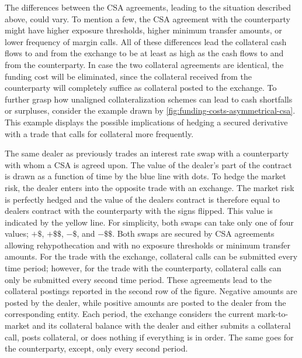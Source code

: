 \documentclass[main.tex]{subfiles}
\begin{document}
        The differences between the CSA agreements, leading to the situation described above, could vary. 
        To mention a few, the CSA agreement with the counterparty might have higher exposure thresholds, 
        higher minimum transfer amounts, or lower frequency of margin calls.
        All of these differences lead the collateral cash flows to and from the exchange 
        to be at least as high as the cash flows to and from the counterparty. 
        In case the two collateral agreements are identical, the funding cost will be eliminated, 
        since the collateral received from the counterparty will completely suffice as collateral posted to the exchange.        
        To further grasp how unaligned collateralization schemes can lead to cash shortfalls or surpluses, 
        consider the example drawn by \cref{fig:funding-costs-asymmetrical-csa}.
        This example displays the possible implications of hedging a secured derivative
        with a trade that calls for collateral more frequently.

        The same dealer as previously trades an interest rate swap with a counterparty with whom a CSA is agreed upon. 
        The value of the dealer's part of the contract is drawn as a function of time by the blue line with dots.
        To hedge the market risk, the dealer enters into the opposite trade with an exchange.
        The market risk is perfectly hedged and the value of the dealers contract is therefore
        equal to dealers contract with the counterparty with the signs flipped.
        This value is indicated by the yellow line.
        For simplicity, both swaps can take only one of four values; $+\$$, $+\$\$$, $-\$$, and $-\$\$$.
        Both swaps are secured by CSA agreements allowing rehypothecation 
        and with no exposure thresholds or minimum transfer amounts.
        For the trade with the exchange, collateral calls can be submitted every time period;
        however, for the trade with the counterparty, collateral calls can only be submitted every second time period.
        These agreements lead to the collateral postings reported in the second row of the figure.
        Negative amounts are posted by the dealer, while positive amounts are posted to the dealer 
        from the corresponding entity.
        Each period, the exchange considers the current mark-to-market and its collateral balance with the dealer
        and either submits a collateral call, posts collateral, or does nothing if everything is in order.
        The same goes for the counterparty, except, only every second period.
\end{document}
